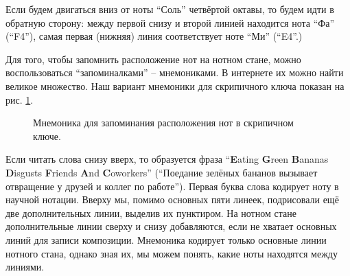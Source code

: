 \documentclass[../sparc.tex]{subfiles}
\begin{document}
Если будем двигаться вниз от ноты ``Соль'' четвёртой октавы, то будем идти в
обратную сторону: между первой снизу и второй линией находится нота ``Фа''
(``F4''), самая первая (нижняя) линия соответствует ноте ``Ми'' (``E4''.)

Для того, чтобы запомнить расположение нот на нотном стане, можно
воспользоваться ``запоминалками'' -- мнемониками. В интернете их можно найти
великое множество.  Наш вариант мнемоники для скрипичного ключа показан на рис.
\ref{fig:lilypond-music-clef-mnemonic}.

\begin{figure}[ht]
  \label{fig:lilypond-music-clef-mnemonic}
  \caption{Мнемоника для запоминания расположения нот в скрипичном ключе.}
\end{figure}

Если читать слова снизу вверх, то образуется фраза ``\textbf{E}ating
\textbf{G}reen \textbf{B}ananas \textbf{D}isgusts \textbf{F}riends \textbf{A}nd
\textbf{C}oworkers'' (``Поедание зелёных бананов вызывает отвращение у друзей и
коллег по работе''). Первая буква слова кодирует ноту в научной нотации. Вверху
мы, помимо основных пяти линеек, подрисовали ещё две дополнительных линии,
выделив их пунктиром. На нотном стане дополнительные линии сверху и снизу
добавляются, если не хватает основных линий для записи композиции. Мнемоника
кодирует только основные линии нотного стана, однако зная их, мы можем понять,
какие ноты находятся между линиями.
\end{document}
